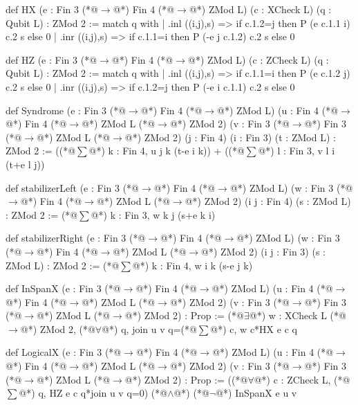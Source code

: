 def HX (e : Fin 3 (*@$\to$@*) Fin 4 (*@$\to$@*) ZMod L) (c : XCheck L) (q : Qubit L) : ZMod 2 := match q with
  | .inl ((i,j),s) => if c.1.2=j then P (e c.1.1 i) c.2 s else 0
  | .inr ((i,j),s) => if c.1.1=i then P (-e j c.1.2) c.2 s else 0

def HZ (e : Fin 3 (*@$\to$@*) Fin 4 (*@$\to$@*) ZMod L) (c : ZCheck L) (q : Qubit L) : ZMod 2 := match q with
  | .inl ((i,j),s) => if c.1.1=i then P (e c.1.2 j) c.2 s else 0
  | .inr ((i,j),s) => if c.1.2=j then P (-e i c.1.1) c.2 s else 0

def Syndrome (e : Fin 3 (*@$\to$@*) Fin 4 (*@$\to$@*) ZMod L)
    (u : Fin 4 (*@$\to$@*) Fin 4 (*@$\to$@*) ZMod L (*@$\to$@*) ZMod 2) (v : Fin 3 (*@$\to$@*) Fin 3 (*@$\to$@*) ZMod L (*@$\to$@*) ZMod 2)
    (j : Fin 4) (i : Fin 3) (t : ZMod L) : ZMod 2 :=
  ((*@$\sum$@*) k : Fin 4, u j k (t-e i k)) + ((*@$\sum$@*) l : Fin 3, v l i (t+e l j))

def stabilizerLeft (e : Fin 3 (*@$\to$@*) Fin 4 (*@$\to$@*) ZMod L)
    (w : Fin 3 (*@$\to$@*) Fin 4 (*@$\to$@*) ZMod L (*@$\to$@*) ZMod 2) (i j : Fin 4) (s : ZMod L) : ZMod 2 :=
  (*@$\sum$@*) k : Fin 3, w k j (s+e k i)

def stabilizerRight (e : Fin 3 (*@$\to$@*) Fin 4 (*@$\to$@*) ZMod L)
    (w : Fin 3 (*@$\to$@*) Fin 4 (*@$\to$@*) ZMod L (*@$\to$@*) ZMod 2) (i j : Fin 3) (s : ZMod L) : ZMod 2 :=
  (*@$\sum$@*) k : Fin 4, w i k (s-e j k)

def InSpanX (e : Fin 3 (*@$\to$@*) Fin 4 (*@$\to$@*) ZMod L)
    (u : Fin 4 (*@$\to$@*) Fin 4 (*@$\to$@*) ZMod L (*@$\to$@*) ZMod 2) (v : Fin 3 (*@$\to$@*) Fin 3 (*@$\to$@*) ZMod L (*@$\to$@*) ZMod 2) : Prop :=
  (*@$\exists$@*) w : XCheck L (*@$\to$@*) ZMod 2, (*@$\forall$@*) q, join u v q=(*@$\sum$@*) c, w c*HX e c q

def LogicalX (e : Fin 3 (*@$\to$@*) Fin 4 (*@$\to$@*) ZMod L)
    (u : Fin 4 (*@$\to$@*) Fin 4 (*@$\to$@*) ZMod L (*@$\to$@*) ZMod 2) (v : Fin 3 (*@$\to$@*) Fin 3 (*@$\to$@*) ZMod L (*@$\to$@*) ZMod 2) : Prop :=
  ((*@$\forall$@*) c : ZCheck L, (*@$\sum$@*) q, HZ e c q*join u v q=0) (*@$\land$@*) (*@$\neg$@*) InSpanX e u v
